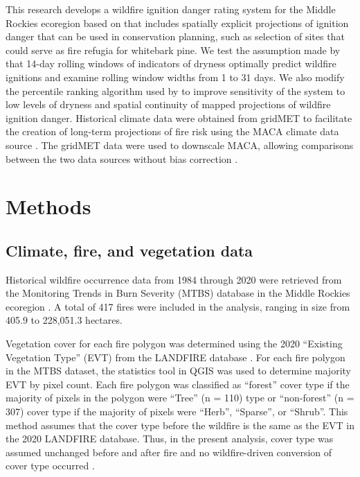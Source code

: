 \documentclass[11p]{article}
\begin{document}
This research develops a wildfire ignition danger rating system for the Middle Rockies ecoregion based on \citet{thomaWaterBalanceIndicator2020} that includes spatially explicit projections of ignition danger that can be used in conservation planning, such as selection of sites that could serve as fire refugia for whitebark pine. We test the assumption made by \citet{thomaWaterBalanceIndicator2020} that 14-day rolling windows of indicators of dryness optimally predict wildfire ignitions and examine rolling window widths from 1 to 31 days. We also modify the percentile ranking algorithm used by \citet{thomaWaterBalanceIndicator2020} to improve sensitivity of the system to low levels of dryness and spatial continuity of mapped projections of wildfire ignition danger. Historical climate data were obtained from gridMET to facilitate the creation of long-term projections of fire risk using the MACA climate data source \citep{abatzoglouComparisonStatisticalDownscaling2012}. The gridMET data were used to downscale MACA, allowing comparisons between the two data sources without bias correction \citep{tercekRobustProjectionsConsequences2023}.


\section{Methods}

\subsection{Climate, fire, and vegetation data}

Historical wildfire occurrence data from 1984 through 2020 were retrieved from the Monitoring Trends in Burn Severity (MTBS) database \citep{eidenshinkProjectMonitoringTrends2007} in the Middle Rockies ecoregion \citep{omernikEcoregionsConterminousUnited1987}. A total of 417 fires were included in the analysis, ranging in size from 405.9 to 228,051.3 hectares.

Vegetation cover for each fire polygon was determined using the 2020 ``Existing Vegetation Type'' (EVT) from the LANDFIRE database \citep{rollinsLANDFIRENationallyConsistent2009}. For each fire polygon in the MTBS dataset, the statistics tool in QGIS was used to determine majority EVT by pixel count. Each fire polygon was classified as ``forest'' cover type if the majority of pixels in the polygon were ``Tree'' (n = 110) type or ``non-forest'' (n = 307) cover type if the majority of pixels were ``Herb'', ``Sparse'', or ``Shrub''. This method assumes that the cover type before the wildfire is the same as the EVT in the 2020 LANDFIRE database. Thus, in the present analysis, cover type was assumed unchanged before and after fire and no wildfire-driven conversion of cover type occurred \citep{coopWildfireDrivenForestConversion2020}.
\end{document}
